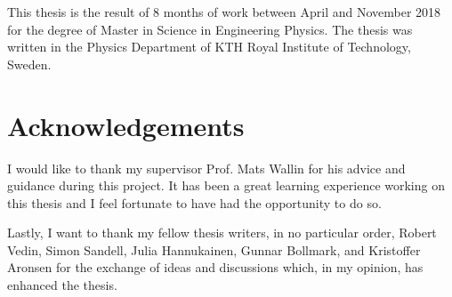 This thesis is the result of 8 months of work between April and November 2018 for the degree of Master in Science in Engineering Physics. The thesis was written in the Physics Department of KTH Royal Institute of Technology, Sweden.

\section*{Acknowledgements}

I would like to thank my supervisor Prof. Mats Wallin for his advice and guidance during this project. It has been a great learning experience working on this thesis and I feel fortunate to have had the opportunity to do so.

Lastly, I want to thank my fellow thesis writers, in no particular order, Robert Vedin, Simon Sandell, Julia Hannukainen, Gunnar Bollmark, and Kristoffer Aronsen for the exchange of ideas and discussions which, in my opinion, has enhanced the thesis.